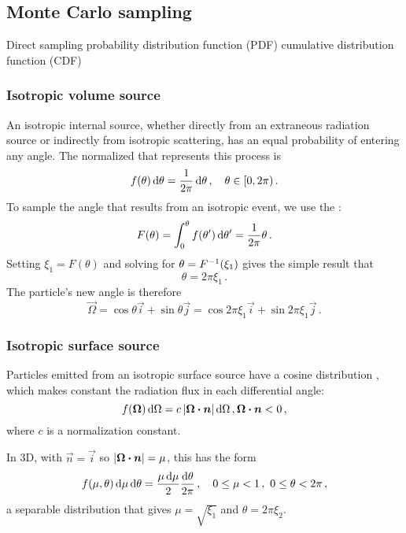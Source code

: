 \clearpage
\subsection{Monte Carlo sampling}
\cite{Lew1984,Bro2004a}
Direct sampling 
probability distribution function (PDF)
cumulative distribution function (CDF)

\subsubsection{Isotropic volume source}
An isotropic internal source, whether directly from an extraneous radiation
source or indirectly from isotropic scattering, has an equal probability of
entering any angle. The normalized  that
represents this process is
\begin{equation*}
  f(\theta) \mathop{}\!\mathrm{d} \theta = \frac{1}{2\pi} \mathop{}\!\mathrm{d} \theta\,, \quad \theta \in [0, 2\pi)\,.
\end{equation*}
To sample the angle that results from an isotropic event, we use the :
\begin{equation*}
  F(\theta) = \int_{0}^{\theta} f(\theta') \mathop{}\!\mathrm{d} \theta' = \frac{1}{2\pi}
  \theta\,.
\end{equation*}
Setting $\xi_1 = F(\theta)$ and solving for $\theta = F^{-1}(\xi_1)$ gives the
simple result that
\begin{equation*}
  \theta = 2\pi \xi_1\,.
\end{equation*}
The particle's new angle is therefore
\begin{equation*}
  \vec{\Omega} = \cos \theta \vec{i} + \sin \theta \vec{j}
  = \cos 2\pi\xi_1\vec{i} + \sin 2\pi\xi_1 \vec{j}\,.
\end{equation*}

\subsubsection{Isotropic surface source}
Particles emitted from an isotropic surface source have a cosine distribution
\cite{Gre2002}, which makes constant the radiation flux in each differential
angle:
\begin{equation}\label{eq:surfaceSource}
  f(\bm{\Omega}) \mathop{}\!\mathrm{d} \Omega = c \left| \bm{\Omega}\bm{\cdot} \bm{n} \right| \mathop{}\!\mathrm{d} \Omega \,,
\bm{\Omega}\bm{\cdot} \bm{n} < 0 \,,
\end{equation}
where $c$ is a normalization constant.

In 3D, with $\vec{n}=\vec{i}$ so $\left| \bm{\Omega}\bm{\cdot} \bm{n} \right|=\mu$, this has
the form
\begin{equation*}
  f(\mu, \theta) \mathop{}\!\mathrm{d}\mu \mathop{}\!\mathrm{d}\theta = \frac{\mu \mathop{}\!\mathrm{d}\mu}{2} \frac{\mathop{}\!\mathrm{d}\theta}{2\pi}
  \,,\quad 0 \le \mu < 1\,,\ 0 \le \theta < 2\pi\,,
\end{equation*}
a separable distribution that gives $\mu=\sqrt{\xi_1}$ and $\theta=2\pi \xi_2$.

